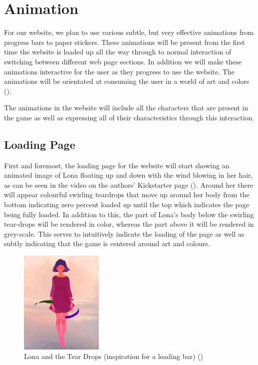 \documentclass{article}
\begin{document}
\section{Animation}
\begin{flushleft}
For our website, we plan to use various subtle, but very effective animations from progress bars to paper stickers. These animations will be present from the first time the website is loaded up all the way through to normal interaction of switching between different web page sections. In addition we will make these animations interactive for the user as they progress to use the website. The animations will be orientated at consuming the user in a world of art and colors (\cite{kickstarter}).
\bigskip

The animations in the website will include all the characters that are present in the game as well as expressing all of their characteristics through this interaction. 
\bigskip

    \subsection{Loading Page}
    First and foremost, the loading page for the website will start showing an animated image of Lona floating up and down with the wind blowing in her hair, as can be seen in the video on the authors' Kickstarter page (\cite{kickstarter}). Around her there will appear colourful swirling teardrops that move up around her body from the bottom indicating zero percent loaded up until the top which indicates the page being fully loaded. In addition to this, the part of Lona's body below the swirling tear-drops will be rendered in color, whereas the part above it will be rendered in grey-scale. This serves to intuitively indicate the loading of the page as well as subtly indicating that the game is centered around art and colours. 
    
    \bigskip
    \begin{figure}[h]
    \centering
    \caption{Lona and the Tear Drops (inspiration for a loading bar) (\cite{youtube_Lona})} 
    \includegraphics[width=150px]{Lona_loading_bar.JPG}
    \end{figure}
    

\end{flushleft}
\end{document}
